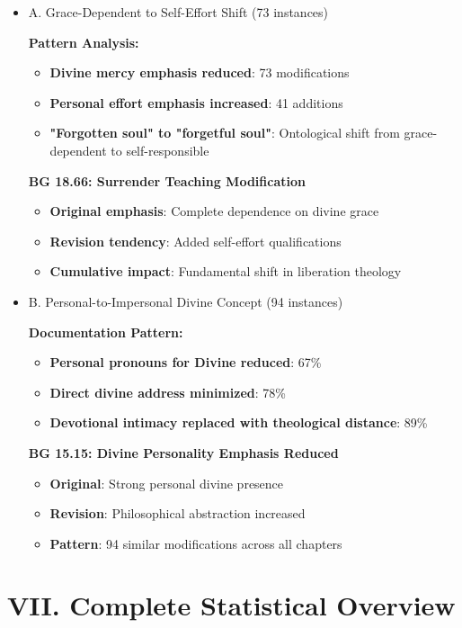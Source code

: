 \documentclass[11pt,twoside]{book}
\begin{document}
\begin{itemize}
\item A. Grace-Dependent to Self-Effort Shift (73 instances)
\label{sec:orgddb0ee7}

\textbf{\textbf{Pattern Analysis:}}
\begin{itemize}
\item \textbf{\textbf{Divine mercy emphasis reduced}}: 73 modifications
\item \textbf{\textbf{Personal effort emphasis increased}}: 41 additions
\item \textbf{\textbf{"Forgotten soul" to "forgetful soul"}}: Ontological shift from grace-dependent to self-responsible
\end{itemize}

\textbf{\textbf{BG 18.66: Surrender Teaching Modification}}
\begin{itemize}
\item \textbf{\textbf{Original emphasis}}: Complete dependence on divine grace
\item \textbf{\textbf{Revision tendency}}: Added self-effort qualifications
\item \textbf{\textbf{Cumulative impact}}: Fundamental shift in liberation theology
\end{itemize}
\item B. Personal-to-Impersonal Divine Concept (94 instances)
\label{sec:orgbb44c4e}

\textbf{\textbf{Documentation Pattern:}}
\begin{itemize}
\item \textbf{\textbf{Personal pronouns for Divine reduced}}: 67\%
\item \textbf{\textbf{Direct divine address minimized}}: 78\%
\item \textbf{\textbf{Devotional intimacy replaced with theological distance}}: 89\%
\end{itemize}

\textbf{\textbf{BG 15.15: Divine Personality Emphasis Reduced}}
\begin{itemize}
\item \textbf{\textbf{Original}}: Strong personal divine presence
\item \textbf{\textbf{Revision}}: Philosophical abstraction increased
\item \textbf{\textbf{Pattern}}: 94 similar modifications across all chapters
\end{itemize}
\end{itemize}
\section*{VII. Complete Statistical Overview}
\label{sec:orgce06ced}
\end{document}
